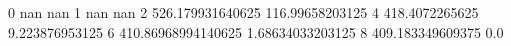 0 nan nan
1 nan nan
2 526.179931640625 116.99658203125
4 418.4072265625 9.223876953125
6 410.86968994140625 1.68634033203125
8 409.183349609375 0.0
